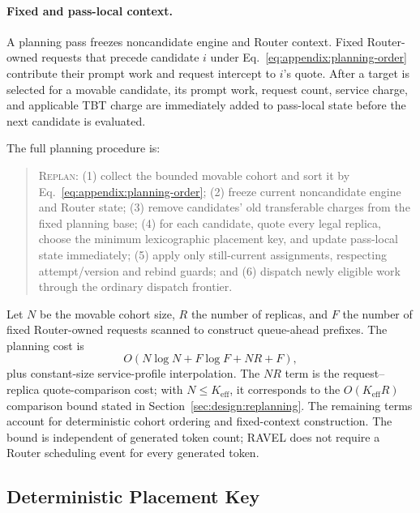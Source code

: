 \paragraph{Fixed and pass-local context.}
A planning pass freezes noncandidate engine and Router context.
Fixed Router-owned requests that precede candidate $i$ under
Eq.~\ref{eq:appendix:planning-order} contribute their prompt work and request
intercept to $i$'s quote.
After a target is selected for a movable candidate, its prompt work, request
count, service charge, and applicable TBT charge are immediately added to
pass-local state before the next candidate is evaluated.

The full planning procedure is:
\begin{quote}
\textsc{Replan}:
(1) collect the bounded movable cohort and sort it by
Eq.~\ref{eq:appendix:planning-order};
(2) freeze current noncandidate engine and Router state;
(3) remove candidates' old transferable charges from the fixed planning base;
(4) for each candidate, quote every legal replica, choose the minimum
lexicographic placement key, and update pass-local state immediately;
(5) apply only still-current assignments, respecting attempt/version and
rebind guards; and
(6) dispatch newly eligible work through the ordinary dispatch frontier.
\end{quote}

Let $N$ be the movable cohort size, $R$ the number of replicas, and $F$ the
number of fixed Router-owned requests scanned to construct queue-ahead
prefixes.
The planning cost is
\begin{equation}
    O(N\log N+F\log F+NR+F),
    \label{eq:appendix:planner-complexity}
\end{equation}
plus constant-size service-profile interpolation.
The $NR$ term is the request--replica quote-comparison cost; with
$N\le K_{\mathrm{eff}}$, it corresponds to the
$O(K_{\mathrm{eff}}R)$ comparison bound stated in
Section~\ref{sec:design:replanning}.
The remaining terms account for deterministic cohort ordering and fixed-context
construction.
The bound is independent of generated token count; RAVEL does not require a
Router scheduling event for every generated token.


\subsection{Deterministic Placement Key}
\label{sec:appendix:placement-key}

